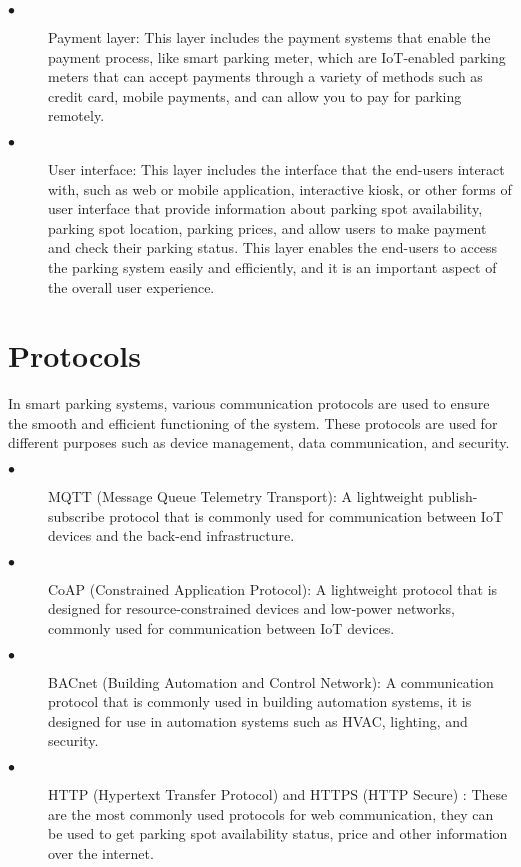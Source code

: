 \documentclass[12pt]{article}
\begin{document}
\begin{description}
  \item[$\bullet$] Payment layer: This layer includes the payment systems that enable the payment process, like smart parking meter, which are IoT-enabled parking meters that can accept payments through a variety of methods such as credit card, mobile payments, and can allow you to pay for parking remotely.
  \item[$\bullet$] User interface: This layer includes the interface that the end-users interact with, such as web or mobile application, interactive kiosk, or other forms of user interface that provide information about parking spot availability, parking spot location, parking prices, and allow users to make payment and check their parking status. This layer enables the end-users to access the parking system easily and efficiently, and it is an important aspect of the overall user experience.
\end{description}


\section{Protocols}
In smart parking systems, various communication protocols are used to ensure the smooth and efficient functioning of the system. These protocols are used for different purposes such as device management, data communication, and security. 
\begin{description}
\item[$\bullet$] MQTT (Message Queue Telemetry Transport): A lightweight publish-subscribe protocol that is commonly used for communication between IoT devices and the back-end infrastructure.
  \item[$\bullet$] CoAP (Constrained Application Protocol): A lightweight protocol that is designed for resource-constrained devices and low-power networks, commonly used for communication between IoT devices.
  \item[$\bullet$] BACnet (Building Automation and Control Network): A communication protocol that is commonly used in building automation systems, it is designed for use in automation systems such as HVAC, lighting, and security.
  \item[$\bullet$] HTTP (Hypertext Transfer Protocol) and HTTPS (HTTP Secure) : These are the most commonly used protocols for web communication, they can be used to get parking spot availability status, price and other information over the internet.
  \\
  \\
  \\
  \\
\end{description} 
\end{document}

